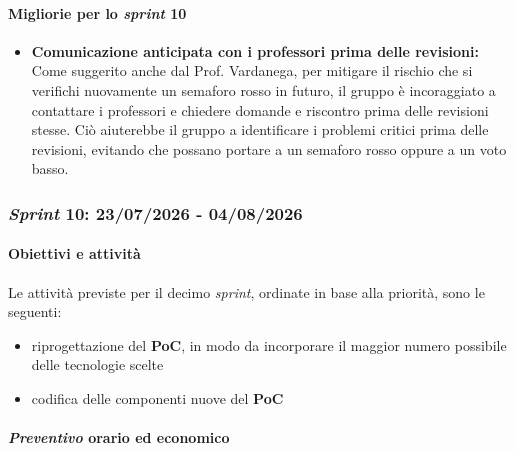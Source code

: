 \documentclass[12pt, a4paper]{article}
\begin{document}
{\paragraph{Migliorie per lo \textit{sprint} 10}
\begin{itemize}
    \item \textbf{Comunicazione anticipata con i professori prima delle revisioni:}  Come suggerito anche dal Prof. Vardanega, per mitigare il rischio che si verifichi nuovamente un semaforo rosso in futuro, il gruppo è incoraggiato a contattare i professori e chiedere domande e riscontro prima delle revisioni stesse. Ciò aiuterebbe il gruppo a identificare i problemi critici prima delle revisioni, evitando che possano portare a un semaforo rosso oppure a un voto basso.
\end{itemize}


\subsubsection{\textit{Sprint} 10: 23/07/2026 - 04/08/2026}

\paragraph{Obiettivi e attività}

Le attività previste per il decimo \textit{sprint}, ordinate in base alla priorità, sono le seguenti:

\begin{itemize}
    \item riprogettazione del \textbf{PoC}, in modo da incorporare il maggior numero possibile delle tecnologie scelte
    \item codifica delle componenti nuove del \textbf{PoC}
\end{itemize}

\paragraph{\textit{Preventivo} orario ed economico}

}
\end{document}
